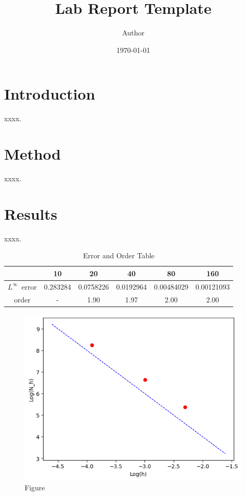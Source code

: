 \documentclass{article}
\title{Lab Report Template}
\author{Author}
\date{\today}
\begin{document}
\maketitle

\section{Introduction}

xxxx.

\section{Method}

xxxx.

\section{Results}

xxxx.

\begin{table}[ht]
    \centering
    \caption{Error and Order Table}\label{tab:demo0}
    \begin{tabular}{c|ccccc}
        \hline
                           & 10       & 20        & 40        & 80         & 160        \\
        \hline
        $L^{\infty}$~error & 0.283284 & 0.0758226 & 0.0192964 & 0.00484029 & 0.00121093 \\
        order              & -        & 1.90      & 1.97      & 2.00       & 2.00       \\
        \hline
    \end{tabular}
\end{table}

\begin{figure}[htbp]
    \centering
    \includegraphics[width=.8\textwidth]{demo1.png}
    \caption{Figure}\label{fig:demo1}
\end{figure}
\end{document}
